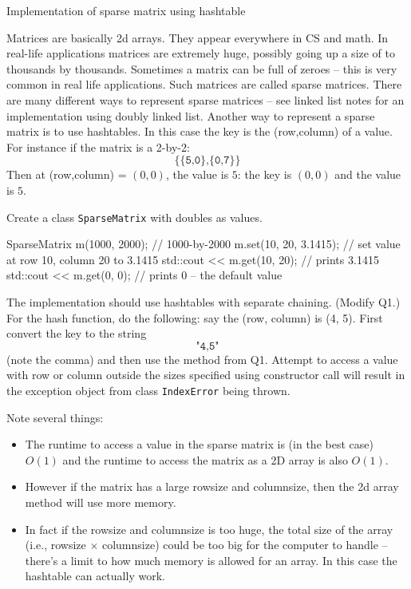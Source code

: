Implementation of sparse matrix using hashtable

Matrices are basically 2d arrays.
They appear everywhere in CS and math.
In real-life applications matrices are extremely huge, possibly
going up a size of to thousands by thousands.
Sometimes a matrix can be full of zeroes -- this is very common in
real life applications.
Such matrices are called sparse matrices.
There are many different ways to represent sparse matrices -- see
linked list notes for an implementation using doubly linked list.
Another way to represent a sparse matrix is to use hashtables.
In this case the key is the (row,column) of a value.
For instance if the matrix is a 2-by-2:
\[
\texttt{\{\{5,0\},\{0,7\}\}}
\]
Then at (row,column) = $(0,0)$, the value is $5$:
the key is $(0,0)$ and the
value is $5$.

Create a class \texttt{SparseMatrix} with doubles as values.
\begin{console}
SparseMatrix m(1000, 2000); // 1000-by-2000
m.set(10, 20, 3.1415);      // set value at row 10, column 20 to 3.1415
std::cout << m.get(10, 20); // prints 3.1415
std::cout << m.get(0, 0);   // prints 0 -- the default value
\end{console}
The implementation should use hashtables with separate chaining.
(Modify Q1.)
For the hash function, do the following:
say the (row, column) is (4, 5). First convert the key to the string
\[
\texttt{"4,5"}
\]
(note the comma) and then use the method from Q1.
Attempt to access a value with row or column outside the sizes
specified using constructor call will result in 
the exception object from class \texttt{IndexError} being thrown.

Note several things:
\begin{itemize}
  \item The runtime to access a value in the sparse matrix is
  (in the best case) $O(1)$ and the runtime to access the matrix as a
  2D array is also $O(1)$.
  \item 
  However if the matrix has a large rowsize and columnsize, then
  the 2d array method will use more memory.
  \item In fact if the rowsize and columnsize is too huge, the
  total size of the array (i.e., rowsize $\times$ columnsize)
  could be too big for the computer to handle -- there's a limit
  to how much memory is allowed for an array.
  In this case the hashtable can actually work.
\end{itemize}
